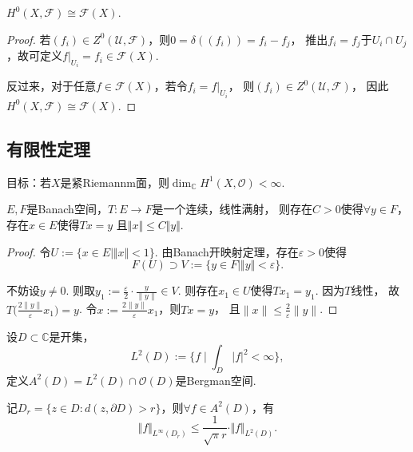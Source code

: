 \begin{proposition}
	$H^0(X, \mathscr{F})\cong \mathscr{F}(X)$.
\end{proposition}
\begin{proof}
	若$(f_i)\in Z^0(\mathscr{U}, \mathscr{F})$，则$0=\delta((f_i))=f_i-f_j$，
    推出$f_i=f_j$于$U_i\cap U_j$，故可定义$f|_{U_i}=f_i\in \mathscr{F}(X)$.

	反过来，对于任意$f\in \mathscr{F}(X)$，若令$f_i=f|_{U_i}$，
    则$(f_i)\in Z^0(\mathscr{U},\mathscr{F})$，
    因此$H^0(X, \mathscr{F})\cong \mathscr{F}(X)$.
\end{proof}


\subsection{有限性定理}

\begin{remark}
	目标：若$X$是紧Riemannm面，则$\dim_\mathbb{C} H^1(X,\mathcal{O})<\infty$.
\end{remark}
		
\begin{proposition}\label{banachineq}
	$E,F$是Banach空间，$T\colon E\rightarrow F$是一个连续，线性满射，
    则存在$C>0$使得$\forall y\in F$，存在$x\in E$使得$Tx=y$
    且$\Vert x\Vert \leq C\Vert y\Vert$.
\end{proposition}

\begin{proof}
	令$U:=\{x\in E\mid \Vert x\Vert < 1\}$. 
    由Banach开映射定理，存在$\varepsilon>0$使得
	$$F(U)\supset V:=\{y\in F\mid \Vert y\Vert <\varepsilon\}.$$

	不妨设$y\neq 0$. 则取$y_1:=\frac{\varepsilon}{2}\cdot \frac{y}{\|y\|}\in V$. 
    则存在$x_1\in U$使得$Tx_1=y_1$. 因为$T$线性，
    故$T\big(\frac{2\|y\|}{\varepsilon}x_1\big)=y$. 
    令$x:=\frac{2\|y\|}{\varepsilon}x_1$，则$Tx=y$，
    且$\|x\| \leq \frac{2}{\varepsilon} \|y\|$.
\end{proof}
		
\begin{definition}
	设$D\subset \mathbb{C}$是开集，
	$$L^2(D):=\{f\mid \int_D \vert f\vert^2<\infty\},$$
	定义$A^2(D)=L^2(D)\cap \mathcal{O}(D)$是Bergman空间.
\end{definition}
		
\begin{lemma}[Bergman不等式]
	记$D_r=\{z\in D:d(z,\partial D)>r\}$，则$\forall f\in A^2(D)$，有
	$$\Vert f\Vert_{L^\infty(D_r)}\leq 
    \frac{1}{\sqrt{\pi}r}\cdot \Vert f\Vert_{L^2(D)}.$$
\end{lemma}
		
